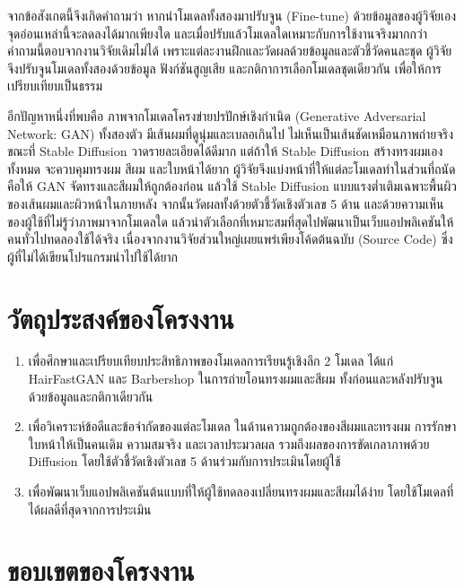 จากข้อสังเกตนี้จึงเกิดคำถามว่า หากนำโมเดลทั้งสองมาปรับจูน (Fine-tune) ด้วยข้อมูลของผู้วิจัยเอง
จุดอ่อนเหล่านี้จะลดลงได้มากเพียงใด และเมื่อปรับแล้วโมเดลใดเหมาะกับการใช้งานจริงมากกว่า
คำถามนี้ตอบจากงานวิจัยเดิมไม่ได้ เพราะแต่ละงานฝึกและวัดผลด้วยข้อมูลและตัวชี้วัดคนละชุด
ผู้วิจัยจึงปรับจูนโมเดลทั้งสองด้วยข้อมูล ฟังก์ชันสูญเสีย และกติกาการเลือกโมเดลชุดเดียวกัน
เพื่อให้การเปรียบเทียบเป็นธรรม

อีกปัญหาหนึ่งที่พบคือ ภาพจากโมเดลโครงข่ายปรปักษ์เชิงกำเนิด (Generative Adversarial Network: GAN) ทั้งสองตัว
มีเส้นผมที่ดูนุ่มและเบลอเกินไป ไม่เห็นเป็นเส้นชัดเหมือนภาพถ่ายจริง
ขณะที่ Stable Diffusion วาดรายละเอียดได้ดีมาก แต่ถ้าให้ Stable Diffusion สร้างทรงผมเองทั้งหมด
จะควบคุมทรงผม สีผม และใบหน้าได้ยาก
ผู้วิจัยจึงแบ่งหน้าที่ให้แต่ละโมเดลทำในส่วนที่ถนัด คือให้ GAN จัดทรงและสีผมให้ถูกต้องก่อน
แล้วใช้ Stable Diffusion แบบแรงต่ำเติมเฉพาะพื้นผิวของเส้นผมและผิวหน้าในภายหลัง
จากนั้นวัดผลทั้งด้วยตัวชี้วัดเชิงตัวเลข 5 ด้าน และด้วยความเห็นของผู้ใช้ที่ไม่รู้ว่าภาพมาจากโมเดลใด
แล้วนำตัวเลือกที่เหมาะสมที่สุดไปพัฒนาเป็นเว็บแอปพลิเคชันให้คนทั่วไปทดลองใช้ได้จริง
เนื่องจากงานวิจัยส่วนใหญ่เผยแพร่เพียงโค้ดต้นฉบับ (Source Code) ซึ่งผู้ที่ไม่ได้เขียนโปรแกรมนำไปใช้ได้ยาก


\section{วัตถุประสงค์ของโครงงาน}

\begin{enumerate}
    \item เพื่อศึกษาและเปรียบเทียบประสิทธิภาพของโมเดลการเรียนรู้เชิงลึก 2 โมเดล ได้แก่ HairFastGAN และ Barbershop
    ในการถ่ายโอนทรงผมและสีผม ทั้งก่อนและหลังปรับจูนด้วยข้อมูลและกติกาเดียวกัน
    \item เพื่อวิเคราะห์ข้อดีและข้อจำกัดของแต่ละโมเดล
    ในด้านความถูกต้องของสีผมและทรงผม การรักษาใบหน้าให้เป็นคนเดิม ความสมจริง และเวลาประมวลผล
    รวมถึงผลของการขัดเกลาภาพด้วย Diffusion
    โดยใช้ตัวชี้วัดเชิงตัวเลข 5 ด้านร่วมกับการประเมินโดยผู้ใช้
    \item เพื่อพัฒนาเว็บแอปพลิเคชันต้นแบบที่ให้ผู้ใช้ทดลองเปลี่ยนทรงผมและสีผมได้ง่าย
    โดยใช้โมเดลที่ได้ผลดีที่สุดจากการประเมิน
\end{enumerate}

\section{ขอบเขตของโครงงาน}

